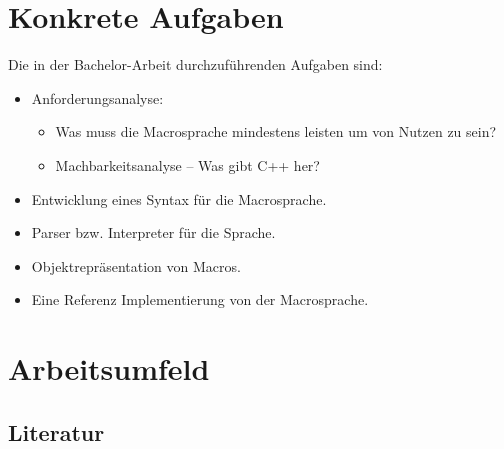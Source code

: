 \section{Konkrete Aufgaben}
\label{sec:konkrete_aufgaben}
  Die in der Bachelor-Arbeit durchzuführenden Aufgaben sind:
  \begin{itemize}
    \item Anforderungsanalyse:
      \begin{itemize}
        \item Was muss die Macrosprache mindestens leisten um von Nutzen zu sein?
        \item Machbarkeitsanalyse -- Was gibt C++ her?
      \end{itemize}
    \item Entwicklung eines Syntax für die Macrosprache.
    \item Parser bzw. Interpreter für die Sprache.
    \item Objektrepräsentation von Macros.
    \item Eine Referenz Implementierung von der Macrosprache.
  \end{itemize}

\section{Arbeitsumfeld}
\label{sec:arbeitsumfeld}

  \subsection{Literatur}
  \label{ssec:literatur}
    \nocite{*}
    \printbibliography

